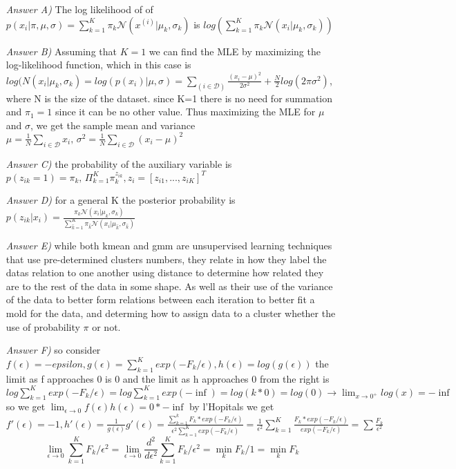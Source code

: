 \begin{Q}
\begin{enumerate}
\end{enumerate}

\begin{itemize}
\item[\textit{Answer A)}] The log likelihood of of $p(x_i |\pi, \mu, \sigma) = \sum_{k=1}^K \pi_k \mathcal{N}(x^{(i)}|\mu_k,\sigma_k)$ is $log(\sum_{k=1}^K \pi_k \mathcal{N}(x_i|\mu_k,\sigma_k) )$

\item[\textit{Answer B)}] Assuming that $K = 1$ we can find the MLE by maximizing the log-likelihood function, which in this case is $log(N(x_i|\mu_k,\sigma_k)= log(p(x_i)|\mu, \sigma) = \sum_(i \in \mathcal{D}) \frac{(x_i-\mu)^2}{2 \sigma^2}+ \frac{N}{2}log(2\pi \sigma^2) $, where N is the size of the dataset. since K=1 there is no need for summation and $\pi_1=1$ since it can be no other value. Thus maximizing the MLE for $\mu$ and $\sigma$, we get the sample mean and variance $\mu = \frac{1}{N}\sum_{i \in \mathcal{D}}x_i  \text{,   }\sigma^2 = \frac{1}{N}\sum_{i \in \mathcal{D}}(x_i-\mu)^2$

\item[\textit{Answer C)}] the probability of the auxiliary variable is $p(z_{ik}=1) =\pi_k \text{, } \Pi^K_{k=1}\pi_k^{z_{ik}},  z_i= [z_{i1},\text{...},z_{iK}]^T$

\item[\textit{Answer D)}] for a general K the posterior probability is $p(z_{ik}|x_i) = \frac{\pi_k \mathcal{N}(x_i|\mu_k,\sigma_k)}{\sum^K_{\widehat{k}=1} \pi_{\widehat{k}} \mathcal{N}(x_i|\mu_{\widehat{k}},\sigma_{\widehat{k}})}$

\item[\textit{Answer E)}] while both kmean and gmm are unsupervised learning techniques that use pre-determined clusters numbers, they relate in how they label the datas relation to one another using distance to determine how related they are to the rest of the data in some shape. As well as their use of the variance of the data to better form relations between each iteration to better fit a mold for the data, and determing how to assign data to a cluster whether the use of probability $\pi$ or not.

\item[\textit{Answer F)}] so consider $f(\epsilon) = -epsilon, g(\epsilon) = \sum_{k=1}^K exp(-F_k/\epsilon), h(\epsilon) = log(g(\epsilon))$ the limit as f approaches 0 is 0 and the limit as h approaches 0 from the right is $log \sum_{k=1}^K exp(-F_k/\epsilon) = log \sum_{k=1}^K exp(-\inf) = log(k*0) = log(0) \rightarrow \lim_{x\rightarrow 0^+} log(x) = -\inf$ so we get $\lim_{\epsilon \rightarrow 0} f(\epsilon)h(\epsilon)=0*-\inf$ by l'Hopitals we get $f'(\epsilon) = -1, h'(\epsilon) = \frac{1}{g(\epsilon)}g'(\epsilon) = \frac{\sum_{k=1}^k F_k*exp(-F_k/\epsilon)}{\epsilon^2 \sum_{k=1}^K exp(-F_k/\epsilon)} = \frac{1}{\epsilon^2} \sum_{k=1}^K \frac{F_k*exp(-F_k/\epsilon)}{exp(-F_k/\epsilon)} = \sum \frac{F_k}{\epsilon^2}$
$$\lim_{\epsilon \rightarrow 0} \sum_{k=1}^K F_k/\epsilon^2 = \lim_{\epsilon \rightarrow 0} \frac{d^2}{d\epsilon^2} \sum^K_{k=1} F_k/\epsilon^2 = \min_{k} F_k / 1 = \min_k F_k$$


\end{itemize}
\end{Q}
